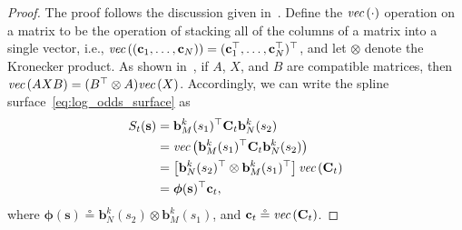 \documentclass{article}
\newcommand{\defeq}{\circeq}
\renewcommand{\vec}[1]{\text{\em vec}\left(#1\right)}
\newcommand{\bbf}{\mathbf{b}}
\newcommand{\cbf}{\mathbf{c}}
\newcommand{\sbf}{\mathbf{s}}
\newcommand{\Cbf}{\mathbf{C}}
\newcommand{\phibf}{\boldsymbol{\phi}}
\begin{document}
\begin{proof}
The proof follows the discussion given in~\cite[Section III.A]{RodriguesTsiogkasAguiar20}.
%
Define the $\vec{\cdot}$ operation on a matrix to be the operation of stacking all of the columns of a matrix into a single vector, i.e., $\vec{(\cbf_1, \dots, \cbf_N)}=(\cbf_1^\top, \dots, \cbf_N^\top)^\top$, and let $\otimes$ denote the Kronecker product. As shown in~\cite{Kronecker_vect}, if $A$, $X$, and $B$ are compatible matrices, then $\vec{AXB}=(B^\top \otimes A)\vec{X}$.  Accordingly, we can write the spline surface~\eqref{eq:log_odds_surface} as
\begin{align*}
S_t(\sbf) &= \bbf_M^k(s_1)^\top \Cbf_t \bbf_N^k(s_2) \\
		  &= \vec{\bbf_M^k(s_1)^\top \Cbf_t \bbf_N^k(s_2)} \\
		  &= \left[\bbf_N^k(s_2)^\top \otimes \bbf_M^k(s_1)^\top \right] \vec{\Cbf_t} \\
		  &= \phibf(\sbf)^\top \cbf_t,
\end{align*}
where $\phibf(\sbf)\defeq \bbf_N^k(s_2) \otimes \bbf_M^k(s_1)$, and $\cbf_t \defeq \vec{\Cbf_t}$.


\end{proof}
\end{document}
